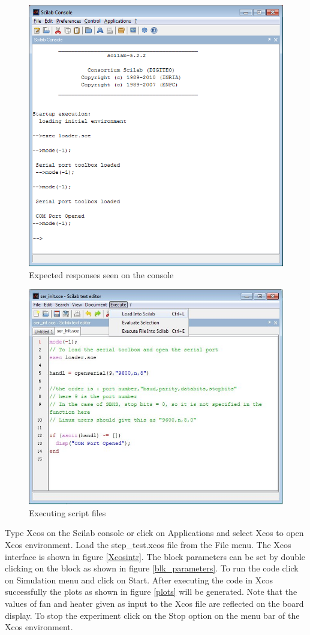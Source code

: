 \begin{figure}
\centering
\includegraphics[width=0.7\linewidth]{using-sbhs/console.png}
\caption{Expected responses seen on the console}
\label{loader}
\end{figure}


\begin{figure}
\centering
\includegraphics[width=0.7\linewidth]{using-sbhs/scilab1.jpg}
\caption{Executing script files}
\label{exec}
\end{figure}


Type {\ttfamily Xcos} on the Scilab console or click on { \ttfamily Applications} and select {\ttfamily Xcos} to open Xcos environment. Load the {\ttfamily step\_test.xcos} file from the { \ttfamily File} menu. The Xcos interface is shown in figure \ref{Xcosintr}. The block parameters can be set by double clicking on the block as shown in figure \ref{blk_parameters}. To run the code click on {\ttfamily Simulation} menu and click on {\ttfamily Start}. After executing the code in Xcos successfully the plots as shown in figure \ref{plots} will be generated. Note that the values of fan and heater given as input to the Xcos file are reflected on the board display. To stop the experiment click on the {\ttfamily Stop} option on the menu bar of the Xcos environment. 

